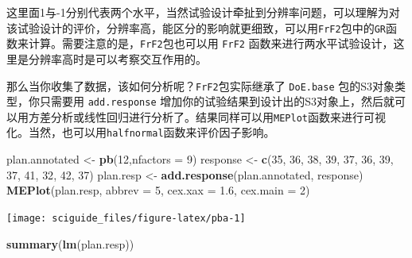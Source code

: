 \documentclass[]{tufte-book}
\newenvironment{Shaded}{}{}
\newcommand{\DataTypeTok}[1]{\textcolor[rgb]{0.56,0.13,0.00}{#1}}
\newcommand{\DecValTok}[1]{\textcolor[rgb]{0.25,0.63,0.44}{#1}}
\newcommand{\FloatTok}[1]{\textcolor[rgb]{0.25,0.63,0.44}{#1}}
\newcommand{\KeywordTok}[1]{\textcolor[rgb]{0.00,0.44,0.13}{\textbf{#1}}}
\newcommand{\NormalTok}[1]{#1}
\newcommand{\StringTok}[1]{\textcolor[rgb]{0.25,0.44,0.63}{#1}}
\begin{document}
这里面1与-1分别代表两个水平，当然试验设计牵扯到分辨率问题，可以理解为对该试验设计的评价，分辨率高，能区分的影响就更细致，可以用\texttt{FrF2}包中的\texttt{GR}函数来计算。需要注意的是，\texttt{FrF2}包也可以用 \texttt{FrF2} 函数来进行两水平试验设计，这里是分辨率高时是可以考察交互作用的。

那么当你收集了数据，该如何分析呢？\texttt{FrF2}包实际继承了 \texttt{DoE.base} 包的S3对象类型，你只需要用 \texttt{add.response} 增加你的试验结果到设计出的S3对象上，然后就可以用方差分析或线性回归进行分析了。结果同样可以用\texttt{MEPlot}函数来进行可视化。当然，也可以用\texttt{halfnormal}函数来评价因子影响。

\begin{Shaded}
\begin{Highlighting}[]
\NormalTok{plan.annotated <-}\StringTok{ }\KeywordTok{pb}\NormalTok{(}\DecValTok{12}\NormalTok{,}\DataTypeTok{nfactors =} \DecValTok{9}\NormalTok{)}
\NormalTok{response <-}\StringTok{ }\KeywordTok{c}\NormalTok{(}\DecValTok{35}\NormalTok{, }\DecValTok{36}\NormalTok{, }\DecValTok{38}\NormalTok{, }\DecValTok{39}\NormalTok{, }\DecValTok{37}\NormalTok{, }\DecValTok{36}\NormalTok{, }\DecValTok{39}\NormalTok{, }\DecValTok{37}\NormalTok{, }\DecValTok{41}\NormalTok{, }\DecValTok{32}\NormalTok{, }\DecValTok{42}\NormalTok{, }\DecValTok{37}\NormalTok{)}
\NormalTok{plan.resp <-}\StringTok{ }\KeywordTok{add.response}\NormalTok{(plan.annotated, response)}
\KeywordTok{MEPlot}\NormalTok{(plan.resp, }\DataTypeTok{abbrev =} \DecValTok{5}\NormalTok{, }\DataTypeTok{cex.xax =} \FloatTok{1.6}\NormalTok{, }\DataTypeTok{cex.main =} \DecValTok{2}\NormalTok{)}
\end{Highlighting}
\end{Shaded}

\texttt{[image: sciguide\_files/figure-latex/pba-1]}

\begin{Shaded}
\begin{Highlighting}[]
\KeywordTok{summary}\NormalTok{(}\KeywordTok{lm}\NormalTok{(plan.resp))}
\end{Highlighting}
\end{Shaded}
\end{document}
